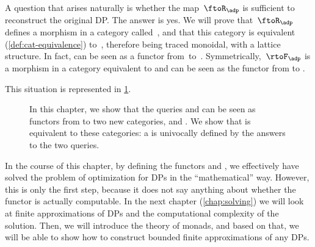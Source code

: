 A question that arises naturally is whether the map~$\ftoR_\adp$ is sufficient to reconstruct the original DP.
The answer is yes.
We will prove that~$\ftoR_\adp$ defines a morphism in a category called~\UPos, and that this category is equivalent (\cref{def:cat-equivalence}) to~\DP, therefore being traced monoidal, with a lattice structure.
In fact, \FixFunMinRes can be seen as a functor from~\DP to~\UPos.
Symmetrically,~$\rtoF_\adp$ is a morphism in a category \LPos equivalent to \DP and \FixResMaxFun can be seen as the functor from \DP to \LPos.

This situation is represented in \cref{fig:upos_lpos_dp}.

\begin{figure}[tbh]
    \centering
    \caption{In this chapter, we show that the queries \FixResMaxFun and \FixFunMinRes
        can be seen as functors from \DP to two new categories, \UPos and \LPos.
        We show that \DP is equivalent to these categories: a \DP is univocally
        defined by the answers to the two queries.
    }
    \label{fig:upos_lpos_dp}
\end{figure}

In the course of this chapter, by defining the functors \FixFunMinRes and \FixResMaxFun, we effectively have solved the problem of optimization for DPs in the ``mathematical'' way.
However, this is only the first step, because it does not say anything about whether the functor is actually computable.
In the next chapter (\cref{chap:solving}) we will look at finite approximations of DPs and the computational complexity of the solution.
Then, we will introduce the theory of monads, and based on that, we will be able to show how to construct bounded finite approximations of any DPs.
